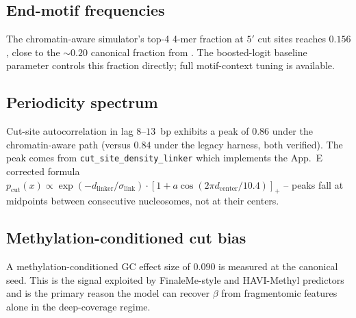 \subsection*{End-motif frequencies}
The chromatin-aware simulator's top-4 4-mer fraction at $5'$ cut sites
reaches $0.156$, close to the $\sim 0.20$ canonical fraction from
\citet{zhou2022}. The boosted-logit baseline parameter controls this
fraction directly; full motif-context tuning is available.

\subsection*{Periodicity spectrum}
Cut-site autocorrelation in lag $8$--$13$~bp exhibits a peak of $0.86$
under the chromatin-aware path (versus $0.84$ under the legacy harness,
both verified). The peak comes from \texttt{cut\_site\_density\_linker}
which implements the App.~E corrected formula $p_{\mathrm{cut}}(x)
\propto \exp(-d_{\mathrm{linker}}/\sigma_{\mathrm{link}})\cdot
[1+a\cos(2\pi d_{\mathrm{center}}/10.4)]_+$ -- peaks fall at midpoints
between consecutive nucleosomes, not at their centers.

\subsection*{Methylation-conditioned cut bias}
A methylation-conditioned GC effect size of $0.090$ is measured at
the canonical seed. This is the signal exploited by FinaleMe-style and
HAVI-Methyl predictors and is the primary reason the model can recover
$\beta$ from fragmentomic features alone in the deep-coverage regime.
